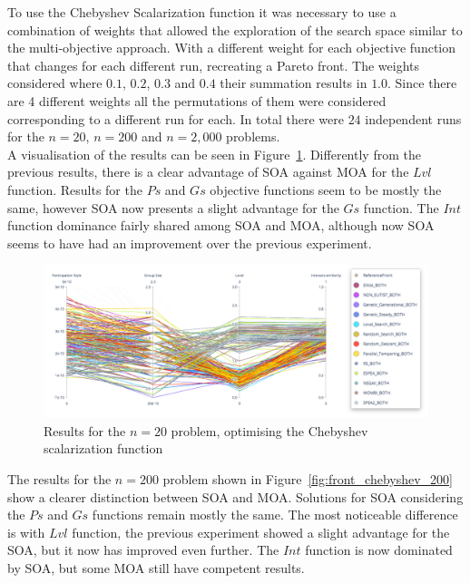 To use the Chebyshev Scalarization function it was necessary to use a combination of weights that allowed the exploration of the search space similar to the multi-objective approach. With a different weight for each objective function that changes for each different run, recreating a Pareto front. The weights considered where $0.1$, $0.2$, $0.3$ and $0.4$ their summation results in $1.0$. Since there are 4 different weights all the permutations of them were considered corresponding to a different run for each. In total there were $24$ independent runs for the $n=20$, $n=200$ and $n=2,000$ problems.\\

A visualisation of the results can be seen in Figure~\ref{fig:front_chebyshev_20}. Differently from the previous results, there is a clear advantage of SOA against MOA for the $Lvl$ function. Results for the $Ps$ and $Gs$ objective functions seem to be mostly the same, however SOA now presents a slight advantage for the $Gs$ function. The $Int$ function dominance fairly shared among SOA and MOA, although now SOA seems to have had an improvement over the previous experiment.

\begin{figure}[H]
    \centering
    \includegraphics[width=\textwidth]{images/chebyshev_20.png}
    \caption{Results for the $n=20$ problem, optimising the Chebyshev scalarization function}
    \label{fig:front_chebyshev_20}
\end{figure}

The results for the $n=200$ problem shown in Figure~\ref{fig:front_chebyshev_200} show a clearer distinction between SOA and MOA. Solutions for SOA considering the $Ps$ and $Gs$ functions remain mostly the same. The most noticeable difference is with $Lvl$ function, the previous experiment showed a slight advantage for the SOA, but it now has improved even further. The $Int$ function is now dominated by SOA, but some MOA still have competent results.


